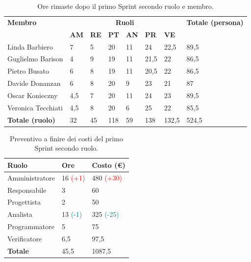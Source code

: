 \begin{table}[ht!]
	\centering
	\begin{tabular}{p{4cm} p{1cm} p{1cm} p{1cm} p{1cm} p{1cm} p{1cm} p{3cm}}
		\toprule
        \textbf{Membro} & \multicolumn{6}{c}{\textbf{Ruoli}} & \textbf{Totale (persona)}\\
		& \textbf{AM} & \textbf{RE} & \textbf{PT} & \textbf{AN} & \textbf{PR} & \textbf{VE}\\
		\midrule
        Linda Barbiero          & 7     & 5     & 20     & 11   & 24     & 22,5   & 89,5 \\
        Guglielmo Barison       & 4     & 9     & 19     & 11   & 21,5   & 22     & 86,5\\
        Pietro Busato           & 6     & 8     & 19     & 11   & 20,5   & 22     & 86,5 \\
        Davide Donanzan         & 6     & 8     & 20     & 9    & 23     & 21     & 87 \\
        Oscar Konieczny         & 4,5   & 7     & 20     & 11   & 24     & 23     & 89,5 \\
        Veronica Tecchiati      & 4,5   & 8     & 20     & 6    & 25     & 22     & 85,5 \\
        \bottomrule
        \textbf{Totale (ruolo)} & 32    & 45    & 118    & 59   & 138     & 132,5 & 524,5 \\
	\end{tabular}
	\caption{Ore rimaste dopo il primo Sprint secondo ruolo e membro.}
	\label{table:Ore rimaste dopo il primo Sprint secondo ruolo e membro}
\end{table}
\begin{table}[ht!]
	\centering
	\begin{tabular}{p{4cm} p{2cm} p{2cm}}
        \toprule
        \textbf{Ruolo} & \textbf{Ore} & \textbf{Costo (€)} \\
        \midrule
        Amministratore & 16 \textcolor{red}{(+1)} & 480 \textcolor{red}{(+30)} \\
        Responsabile & 3 & 60 \\
        Progettista & 2 & 50 \\
        Analista & 13 \textcolor{teal}{(-1)} & 325 \textcolor{teal}{(-25)} \\
        Programmatore & 5 & 75 \\
        Verificatore & 6,5 & 97,5 \\
        \bottomrule
        \textbf{Totale} & 45,5 & 1087,5
    \end{tabular}
    \caption{Preventivo a finire dei costi del primo Sprint secondo ruolo.}
	\label{table:Preventivo a finire dei costi del primo Sprint secondo ruolo}
\end{table}
